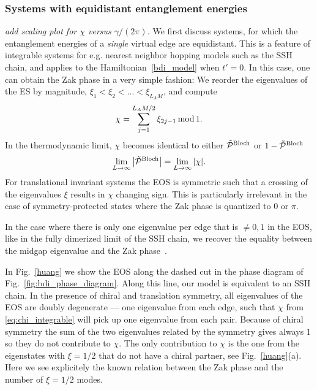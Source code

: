 \documentclass[twocolumn,amsmath,longbibliography,amssymb,superscriptaddress]{revtex4-1}
\newcommand{\mariac}[1]{{\it\color{cyan}#1}}
\begin{document}
\subsubsection{Systems with equidistant entanglement energies}
\mariac{add scaling plot for $\chi$ versus $\gamma/(2\pi)$. }
We first discuss systems, for which the entanglement energies of a \emph{single} virtual edge are equidistant. This is a feature of integrable systems \cite{Peschel1999} for e.g. nearest neighbor hopping models such as the SSH chain, and applies to the Hamiltonian~\eqref{bdi_model} when $t'=0$. 
In this case, one can obtain the Zak phase in a very simple fashion: We reorder the eigenvalues of the ES by magnitude, $\xi_1 < \xi_2 < ...< \xi_{L_AM}$, and compute
\begin{equation}
\chi = \sum_{j=1}^{L_A M/2} \xi_{2j-1} \, {\rm mod} \, 1.
\label{eq:chi_integrable}
\end{equation}
In the thermodynamic limit, $\chi$ becomes identical to either $\tilde{\mathcal{P}}^{\rm Bloch}$ or $1-\tilde{\mathcal{P}}^{\rm Bloch}$
\begin{equation}
\lim_{L \rightarrow \infty} \abs{\tilde{\mathcal{P}}^{\rm Bloch}} = \lim_{L \rightarrow \infty} \abs{\chi}.
\end{equation}
For translational invariant systems the EOS is symmetric such that a crossing of the eigenvalues $\xi$ results in $\chi$ changing sign. This is particularly irrelevant in the case of symmetry-protected states where the Zak phase is quantized to $0$ or $\pi$. 

In the case where there is only one eigenvalue per edge that is $\neq 0,1$ in  the EOS, like in the fully dimerized limit of the SSH chain, we recover the equality between the midgap eigenvalue and the Zak phase~\cite{Ryu2006}. 

In Fig.~\ref{huang} we show  the EOS along the dashed cut in the phase diagram of Fig.~\ref{fig:bdi_phase_diagram}. 
Along this line, our model is equivalent to an SSH chain. 
In the presence of chiral and translation symmetry, all eigenvalues of the EOS are doubly degenerate --- one eigenvalue from each edge, such that $\chi$ from \eqref{eq:chi_integrable} will pick up one eigenvalue from each pair. Because of chiral symmetry the sum of the two eigenvalues related by the symmetry gives always $1$ so they do not contribute to $\chi$. The only contribution to $\chi$ is the one from the eigenstates with $\xi=1/2$ that do not have a chiral partner, see Fig.~\ref{huang}(a). Here we see explicitely the known relation between the Zak phase and the number of $\xi = 1/2$ modes.
\end{document}
